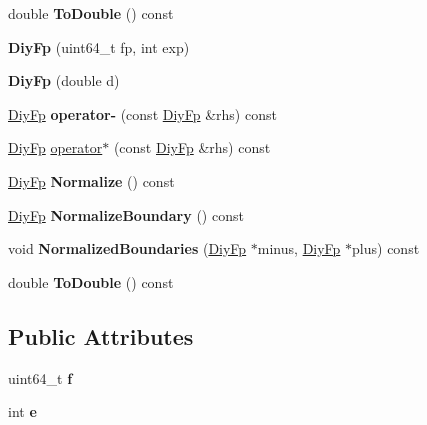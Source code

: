\begin{DoxyCompactItemize}
double {\bfseries To\+Double} () const
\item 
\mbox{\label{structinternal_1_1DiyFp_a9a8f2f5c49dfa0dee4a527f0829cc2e5}} 
{\bfseries Diy\+Fp} (uint64\+\_\+t fp, int exp)
\item 
\mbox{\label{structinternal_1_1DiyFp_adc132c7da4c8e3ee5ae12efdcf6dbf7c}} 
{\bfseries Diy\+Fp} (double d)
\item 
\mbox{\label{structinternal_1_1DiyFp_a9cea201daabec04c6f2526b35af8ead3}} 
\hyperlink{structinternal_1_1DiyFp}{Diy\+Fp} {\bfseries operator-\/} (const \hyperlink{structinternal_1_1DiyFp}{Diy\+Fp} \&rhs) const
\item 
\hyperlink{structinternal_1_1DiyFp}{Diy\+Fp} \hyperlink{structinternal_1_1DiyFp_a9868841f824924cc385ad5163c9c85b3}{operator$\ast$} (const \hyperlink{structinternal_1_1DiyFp}{Diy\+Fp} \&rhs) const
\item 
\mbox{\label{structinternal_1_1DiyFp_aa6cbacc8dfcd92cb8c57884e45548976}} 
\hyperlink{structinternal_1_1DiyFp}{Diy\+Fp} {\bfseries Normalize} () const
\item 
\mbox{\label{structinternal_1_1DiyFp_a3a840e739b412e20e11c05a03f4573df}} 
\hyperlink{structinternal_1_1DiyFp}{Diy\+Fp} {\bfseries Normalize\+Boundary} () const
\item 
\mbox{\label{structinternal_1_1DiyFp_adef8bf723f24db9dc6cefa260e8c2390}} 
void {\bfseries Normalized\+Boundaries} (\hyperlink{structinternal_1_1DiyFp}{Diy\+Fp} $\ast$minus, \hyperlink{structinternal_1_1DiyFp}{Diy\+Fp} $\ast$plus) const
\item 
\mbox{\label{structinternal_1_1DiyFp_acf0e7974f0a1175ae04edf8e4a7d1319}} 
double {\bfseries To\+Double} () const
\end{DoxyCompactItemize}
\subsection*{Public Attributes}
\begin{DoxyCompactItemize}
\item 
\mbox{\label{structinternal_1_1DiyFp_a09b9217a86e8a2e6aa8d2d48fc351008}} 
uint64\+\_\+t {\bfseries f}
\item 
\mbox{\label{structinternal_1_1DiyFp_afa9db335eeb61c7f966d888d89b1e6f2}} 
int {\bfseries e}
\end{DoxyCompactItemize}
